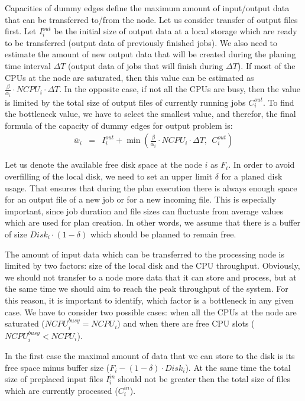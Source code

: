 \documentclass{svjour3}                     %
\begin{document}
Capacities of dummy edges define the maximum amount of input/output data that can be transferred to/from the node. Let us consider transfer of output files first. Let $I_{i}^{out}$ be the initial size of output data at a local storage which are ready to be transferred (output data of previously finished jobs). We also need to estimate the amount of new output data that will be created during the planing time interval $\Delta T$ (output data of jobs that will finish during $\Delta T$). If most of the CPUs at the node are saturated, then this value can be estimated as $\frac{\beta}{\alpha_{i}} \cdot NCPU_{i} \cdot \Delta T$. In the opposite case, if not all the CPUs are busy, then the value is limited by the total size of output files of currently running jobs $C_{i}^{out}$. To find the bottleneck value, we have to select the smallest value, and therefor, the final formula of the capacity of dummy edges for output problem is:
\begin{eqnarray}
\overline{w}_{i} &=& I_{i}^{out} + \min(\frac{\beta}{\alpha_{i}} \cdot NCPU_{i} \cdot \Delta T,\ \  C_{i}^{out}) \label{sigma}
\end{eqnarray}  

Let us denote the available free disk space at the node $i$ as $F_{i}$. In order to avoid overfilling of the local disk, we need to set an upper limit $\delta$ for a planed disk usage. That ensures that during the plan execution there is always enough space for an output file of a new job or for a new incoming file. This is especially important, since job duration and file sizes can fluctuate from average values which are used for plan creation. In other words, we assume that there is a buffer of size $Disk_{i} \cdot (1 - \delta)$ which should be planned to remain free.

The amount of input data which can be transferred to the processing node is limited by two factors: size of the local disk and the CPU throughput. Obviously, we should not transfer to a node more data that it can store and process, but at the same time we should aim to reach the peak throughput of the system. For this reason, it is important to identify, which factor is a bottleneck in any given case. We have to consider two possible cases: when all the CPUs at the node are saturated ($NCPU_{i}^{busy} = NCPU_{i}$) and when there are free CPU slots ($NCPU_{i}^{busy} < NCPU_{i}$). 

In the first case the maximal amount of data that we can store to the disk is its free space minus buffer size ($F_{i} -  (1 - \delta) \cdot Disk_{i}$). At the same time the total size of preplaced input files $I_{i}^{in}$ should not be greater then the total size of files which are currently processed ($C_{i}^{in}$). 
\end{document}
